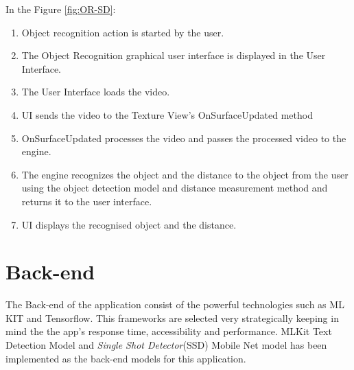 \documentclass[MScCS]{uccthesis}
\begin{document}
   In the Figure \ref{fig:OR-SD}:
   \begin{enumerate}
    \item Object recognition action is started by the user.
    \item The Object Recognition graphical user interface is displayed in the User Interface.
    \item The User Interface loads the video.
    \item UI sends the video to the Texture View's OnSurfaceUpdated method
    \item OnSurfaceUpdated processes the video and passes the processed video to the engine.
    \item The engine recognizes the object and the distance to the object from the user using the object detection model and distance measurement method and returns it to the user interface.
    \item UI displays the recognised object and the distance.
\end{enumerate}


\section{Back-end}

The Back-end of the application consist of the powerful technologies such as ML KIT and Tensorflow. This frameworks are selected very strategically keeping in mind the the app's response time, accessibility and performance.
MLKit Text Detection Model and \textit{Single Shot Detector}(SSD) Mobile Net model has been implemented as the back-end models for this application.
\end{document}
